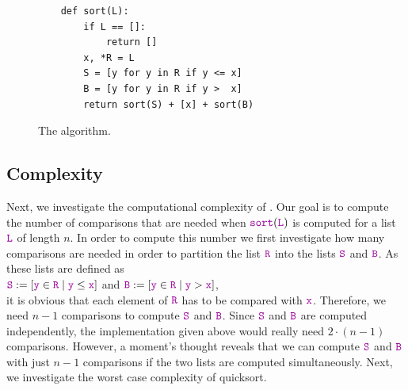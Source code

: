 \begin{figure}[!ht]
  \centering
\begin{verbatim}
    def sort(L):
        if L == []:
            return []
        x, *R = L
        S = [y for y in R if y <= x]
        B = [y for y in R if y >  x]
        return sort(S) + [x] + sort(B)
\end{verbatim}
\vspace*{-0.3cm}
  \caption{The  algorithm.}
  \label{fig:quick-sort.stlx}
\end{figure}

\subsection{Complexity}
Next, we investigate the computational complexity of .
Our goal is to compute the number of comparisons that are needed when
$\mytt{sort}(\mytt{L})$ is computed for a list $\mytt{L}$ of length $n$.  In order to compute this number we
first investigate how many comparisons are needed in order to partition the list $\mytt{R}$
into the lists $\mytt{S}$ and $\mytt{B}$.  As these lists are defined as 
\\[0.2cm]
\hspace*{1.3cm}
 $\mytt{S} := [\mytt{y} \in \mytt{R} \mid \mytt{y} \leq \mytt{x}]$ \quad and \quad
 $\mytt{B} := [\mytt{y} \in \mytt{R} \mid \mytt{y} > \mytt{x}]$,
\\[0.2cm]
it is obvious that each element of $\mytt{R}$ has to be compared with $\mytt{x}$.
Therefore, we need $n-1$ comparisons to compute $\mytt{S}$ and $\mytt{B}$.  Since $\mytt{S}$ and
$\mytt{B}$ are computed independently, the implementation given above 
would really need $2 \cdot (n-1)$ comparisons.  However, a moment's thought reveals that we can compute $\mytt{S}$ and $\mytt{B}$
with just $n-1$ comparisons if the two lists are computed simultaneously.
Next, we investigate the worst case complexity of quicksort.

